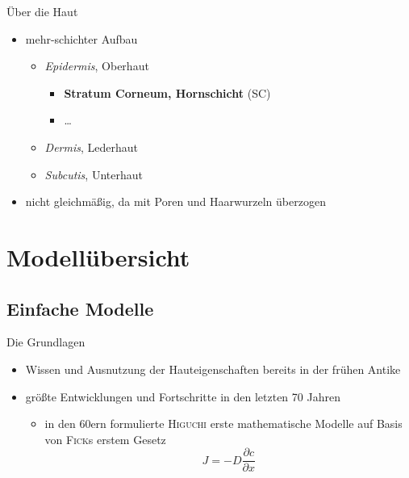 \documentclass[utf8x,compress,professionalfonts]{beamer}
\begin{document}
\begin{frame}{\"Uber die Haut}
  \begin{itemize}
    \item mehr-schichter Aufbau
      \begin{itemize}
        \item \textit{Epidermis}, Oberhaut
          \begin{itemize}
            \item \textbf{Stratum Corneum, Hornschicht} (SC)
            \item \dots
          \end{itemize}
        \item \textit{Dermis}, Lederhaut
        \item \textit{Subcutis}, Unterhaut
      \end{itemize}
      \bigskip
    \item nicht gleichm\"a\ss{}ig, da mit Poren und Haarwurzeln \"uberzogen
  \end{itemize}
\end{frame}

\section{Modell\"ubersicht}
\subsection{Einfache Modelle}
\begin{frame}{Die Grundlagen}
  \begin{itemize}
    \item<1-> Wissen und Ausnutzung der Hauteigenschaften bereits in der fr\"uhen
      Antike
      \bigskip
    \item<2-> gr\"o\ss{}te Entwicklungen und Fortschritte in den letzten 70 Jahren
      \bigskip
      \begin{itemize}
        \item<3-> in den 60ern formulierte \textsc{Higuchi} erste mathematische
          Modelle auf Basis von \textsc{Fick}s erstem Gesetz
          \begin{equation}
            J=-D\frac{\partial c}{\partial x}
          \end{equation}
      \end{itemize}
  \end{itemize}
\end{frame}
\end{document}
